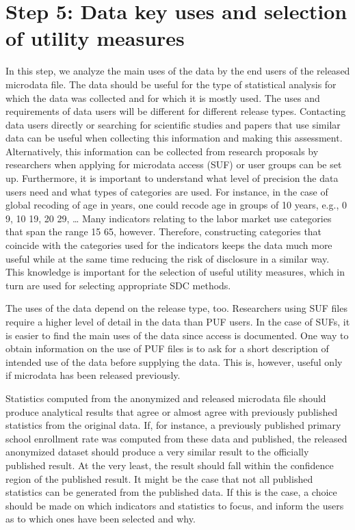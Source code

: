 \documentclass[letterpaper,10pt,english]{sphinxmanual}
\begin{document}
\section{Step 5: Data key uses and selection of utility measures}
\label{\detokenize{process:step-5-data-key-uses-and-selection-of-utility-measures}}
In this step, we analyze the main uses of the data by the end users of
the released microdata file. The data should be useful for the type of
statistical analysis for which the data was collected and for which it
is mostly used. The uses and requirements of data users will be
different for different release types. Contacting data users directly or
searching for scientific studies and papers that use similar data can be
useful when collecting this information and making this assessment.
Alternatively, this information can be collected from research proposals
by researchers when applying for microdata access (SUF) or user groups
can be set up. Furthermore, it is important to understand what level of
precision the data users need and what types of categories are used. For
instance, in the case of global recoding of age in years, one could
recode age in groups of 10 years, e.g., 0 \textendash{} 9, 10 \textendash{} 19, 20 \textendash{} 29, … Many
indicators relating to the labor market use categories that span the
range 15 \textendash{} 65, however. Therefore, constructing categories that coincide
with the categories used for the indicators keeps the data much more
useful while at the same time reducing the risk of disclosure in a
similar way. This knowledge is important for the selection of useful
utility measures, which in turn are used for selecting appropriate SDC
methods.

The uses of the data depend on the release type, too. Researchers using
SUF files require a higher level of detail in the data than PUF users.
 In the case of SUFs, it is
easier to find the main uses of the data since access is documented. One
way to obtain information on the use of PUF files is to ask for a short
description of intended use of the data before supplying the data. This
is, however, useful only if microdata has been released previously.

Statistics computed from the anonymized and released microdata file
should produce analytical results that agree or almost agree with
previously published statistics from the original data. If, for
instance, a previously published primary school enrollment rate was
computed from these data and published, the released anonymized dataset
should produce a very similar result to the officially published result.
At the very least, the result should fall within the confidence region
of the published result. It might be the case that not all published
statistics can be generated from the published data. If this is the
case, a choice should be made on which indicators and statistics to
focus, and inform the users as to which ones have been selected and why.
\end{document}

